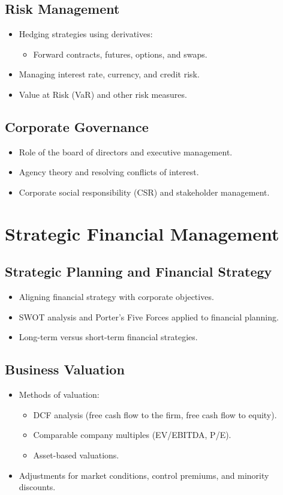 \subsection{Risk Management}
\begin{itemize}
  \item Hedging strategies using derivatives:
  \begin{itemize}
    \item Forward contracts, futures, options, and swaps.
  \end{itemize}
  \item Managing interest rate, currency, and credit risk.
  \item Value at Risk (VaR) and other risk measures.
\end{itemize}

\subsection{Corporate Governance}
\begin{itemize}
  \item Role of the board of directors and executive management.
  \item Agency theory and resolving conflicts of interest.
  \item Corporate social responsibility (CSR) and stakeholder management.
\end{itemize}
    

\section{Strategic Financial Management}
\subsection{Strategic Planning and Financial Strategy}
\begin{itemize}
  \item Aligning financial strategy with corporate objectives.
  \item SWOT analysis and Porter's Five Forces applied to financial planning.
  \item Long-term versus short-term financial strategies.
\end{itemize}

\subsection{Business Valuation}
\begin{itemize}
  \item Methods of valuation:
  \begin{itemize}
    \item DCF analysis (free cash flow to the firm, free cash flow to equity).
    \item Comparable company multiples (EV/EBITDA, P/E).
    \item Asset-based valuations.
  \end{itemize}
  \item Adjustments for market conditions, control premiums, and minority discounts.
\end{itemize}
        
